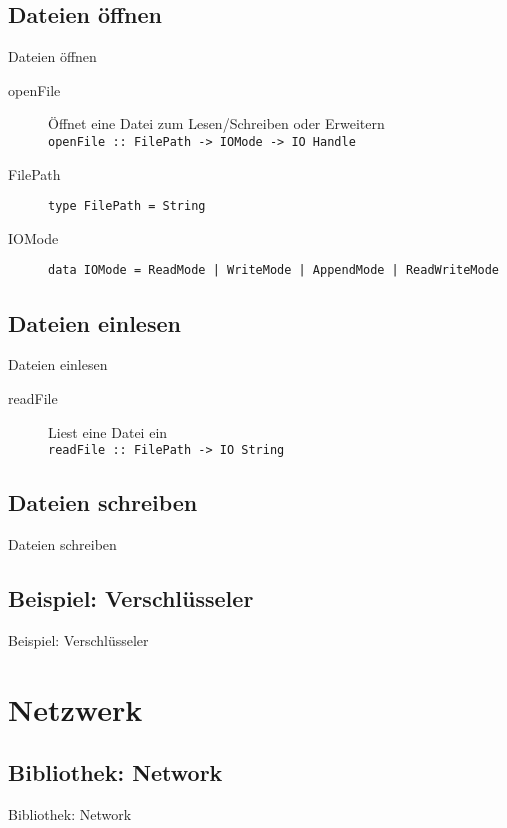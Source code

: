 \documentclass{beamer}
\begin{document}
\subsection{Dateien \"offnen}
\begin{frame}{Dateien \"offnen}
\begin{description}
\item[openFile] Öffnet eine Datei zum Lesen/Schreiben oder Erweitern \\ \texttt{\small openFile :: FilePath -> IOMode -> IO Handle}
\item[FilePath] \texttt{type FilePath = String}
\item[IOMode] \texttt{data IOMode = ReadMode | WriteMode | AppendMode | ReadWriteMode}
\end{description}
\end{frame}

\subsection{Dateien einlesen}
\begin{frame}{Dateien einlesen}
\begin{description}
\item[readFile] Liest eine Datei ein \\ 
\texttt{readFile :: FilePath -> IO String}
\end{description}
\end{frame}

\subsection{Dateien schreiben}
\begin{frame}{Dateien schreiben}
\end{frame}

\subsection{Beispiel: Verschl\"usseler}
\begin{frame}{Beispiel: Verschl\"usseler}
\end{frame}

\section{Netzwerk}
\subsection{Bibliothek: Network}
\begin{frame}{Bibliothek: Network}
\end{frame}
\end{document}
